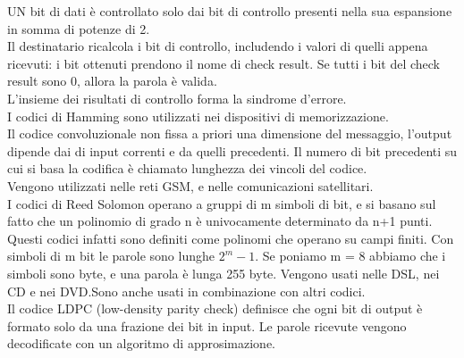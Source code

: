 \documentclass{article}
\begin{document}
UN bit di dati è controllato solo dai bit di controllo presenti nella sua espansione in somma di potenze di 2. \\
Il destinatario ricalcola i bit di controllo, includendo i valori di quelli appena ricevuti: i bit ottenuti prendono il nome di check result. Se tutti i bit del check result sono 0, allora la parola è valida. \\
L'insieme dei risultati di controllo forma la sindrome d'errore.\\
I codici di Hamming sono utilizzati nei dispositivi di memorizzazione.\\
Il codice convoluzionale non fissa a priori una dimensione del messaggio, l'output dipende dai di input correnti e da quelli precedenti. Il numero di bit precedenti su cui si basa la codifica è chiamato lunghezza dei vincoli del codice. \\
Vengono utilizzati nelle reti GSM, e nelle comunicazioni satellitari. \\
I codici di Reed Solomon operano a gruppi di m simboli di bit, e si basano sul fatto che un polinomio di grado n è univocamente determinato da n+1 punti. Questi codici infatti sono definiti come polinomi che operano su campi finiti. Con simboli di m bit le parole sono lunghe $2^m-1$. Se poniamo m = 8 abbiamo che i simboli sono byte, e una parola è lunga 255 byte. Vengono usati nelle DSL, nei CD e nei DVD.Sono anche usati in combinazione con altri codici.\\
Il codice LDPC (low-density parity check) definisce che ogni bit di output è formato solo da una frazione dei bit in input. Le parole ricevute vengono decodificate con un algoritmo di approsimazione.
\end{document}

